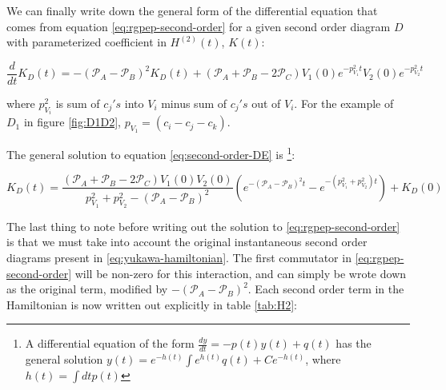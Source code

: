 We can finally write down the general form of the differential equation that comes from equation \ref{eq:rgpep-second-order} for a given second order diagram $D$ with parameterized coefficient in $H^{(2)}(t)$, $K(t)$:

\begin{equation}
    \label{eq:second-order-DE}
    \frac{d}{dt}K_D(t) = -\left(\mathcal{P}_A - \mathcal{P}_B \right)^2 K_D(t) + \left(\mathcal{P}_A + \mathcal{P}_B - 2\mathcal{P}_C \right)V_1(0)e^{-p_{V_1}^2t}V_2(0)e^{-p_{V_2}^2t}
\end{equation}

where $p_{V_i}^2$ is sum of $c_j's$ into $V_i$ minus sum of $c_j's$ out of $V_i$. 
For the example of $D_1$ in figure \ref{fig:D1D2}, $p_{V_1} = \left(c_i - c_j - c_k \right)$.

The general solution to equation \ref{eq:second-order-DE} is \footnote{A differential equation of the form $\frac{dy}{dt} = -p(t)y(t) + q(t)$ has the general solution $y(t) = e^{-h(t)}\int e^{h(t)}q(t) + Ce^{-h(t)}$, where $h(t) = \int dt p(t)$}:

\begin{equation}
    K_D(t) = \frac{\left(\mathcal{P}_A + \mathcal{P}_B - 2\mathcal{P}_C \right)V_1(0)V_2(0)}{p_{V_1}^2 + p_{V_2}^2 - \left(\mathcal{P}_A - \mathcal{P}_B \right)^2} \left(e^{-\left( \mathcal{P}_A - \mathcal{P}_B\right)^2t} - e^{-\left(p_{V_1}^2 + p_{V_2}^2\right)t} \right) + K_D(0)
\end{equation}

The last thing to note before writing out the solution to \ref{eq:rgpep-second-order} is that we must take into account the original instantaneous second order diagrams present in \ref{eq:yukawa-hamiltonian}. 
The first commutator in \ref{eq:rgpep-second-order} will be non-zero for this interaction, and can simply be wrote down as the original term, modified by $-\left(\mathcal{P}_A - \mathcal{P}_B \right)^2$. 
Each second order term in the Hamiltonian is now written out explicitly in table \ref{tab:H2}:


